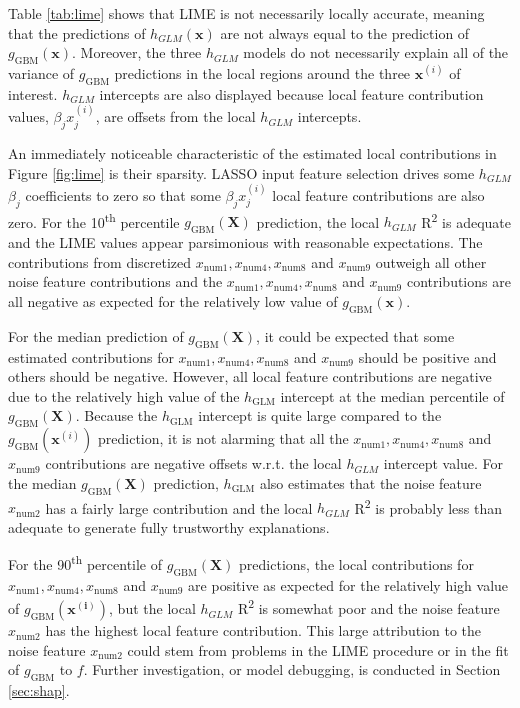 \documentclass[sigconf]{acmart}
\begin{document}
Table \ref{tab:lime} shows that LIME is not necessarily locally accurate, meaning that the predictions of $h_{GLM}(\mathbf{x})$ are not always equal to the prediction of $g_{\text{GBM}}(\mathbf{x})$. Moreover, the three $h_{GLM}$ models do not necessarily explain all of the variance of $g_{\text{GBM}}$ predictions in the local regions around the three $\mathbf{x}^{(i)}$ of interest. $h_{GLM}$ intercepts are also displayed because local feature contribution values, $\beta_j x_j^{(i)}$, are offsets from the local $h_{GLM}$ intercepts.

An immediately noticeable characteristic of the estimated local contributions in Figure \ref{fig:lime} is their sparsity. LASSO input feature selection drives some $h_{GLM}$ $\beta_j$ coefficients to zero so that some $\beta_j x_j^{(i)}$ local feature contributions are also zero. For the 10\textsuperscript{th} percentile $g_{\text{GBM}}(\mathbf{X})$ prediction, the local $h_{GLM}$ R\textsuperscript{2} is adequate and the LIME values appear parsimonious with reasonable expectations. The contributions from discretized $x_{\text{num}1}, x_{\text{num}4}, x_{\text{num}8}$ and $x_{\text{num}9}$ outweigh all other noise feature contributions and the $x_{\text{num}1}, x_{\text{num}4}, x_{\text{num}8}$ and $x_{\text{num}9}$ contributions are all negative as expected for the relatively low value of $g_{\text{GBM}}(\mathbf{x})$. 

For the median prediction of $g_{\text{GBM}}(\mathbf{X})$, it could be expected that some estimated contributions for $x_{\text{num}1}, x_{\text{num}4}, x_{\text{num}8}$ and $x_{\text{num}9}$ should be positive and others should be negative. However, all local feature contributions are negative due to the relatively high value of the $h_{\text{GLM}}$ intercept at the median percentile of $g_{\text{GBM}}(\mathbf{X})$. Because the $h_{\text{GLM}}$ intercept is quite large compared to the $g_{\text{GBM}}(\mathbf{x}^{(i)})$ prediction, it is not alarming that all the $x_{\text{num}1}, x_{\text{num}4}, x_{\text{num}8}$ and $x_{\text{num}9}$ contributions are negative offsets w.r.t. the local $h_{GLM}$ intercept value. For the median $g_{\text{GBM}}(\mathbf{X})$ prediction, $h_{\text{GLM}}$ also estimates that the noise feature $x_{\text{num}2}$ has a fairly large contribution and the local $h_{GLM}$ R\textsuperscript{2} is probably less than adequate to generate fully trustworthy explanations.

For the 90\textsuperscript{th} percentile of $g_{\text{GBM}}(\mathbf{X})$ predictions, the local contributions for $x_{\text{num}1}, x_{\text{num}4}, x_{\text{num}8}$ and $x_{\text{num}9}$ are positive as expected for the relatively high value of $g_{\text{GBM}}(\mathbf{x^{(i)}})$, but the local $h_{GLM}$ R\textsuperscript{2} is somewhat poor and the noise feature $x_{\text{num}2}$ has the highest local feature contribution. This large attribution to the noise feature $x_{\text{num}2}$ could stem from problems in the LIME procedure or in the fit of $g_{\text{GBM}}$ to $f$. Further investigation, or model debugging, is conducted in Section \ref{sec:shap}.
\end{document}
